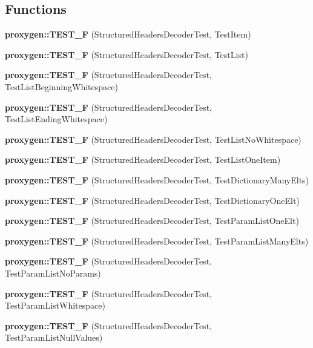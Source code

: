 \subsection*{Functions}
\begin{DoxyCompactItemize}
\item 
{\bf proxygen\+::\+T\+E\+S\+T\+\_\+F} (Structured\+Headers\+Decoder\+Test, Test\+Item)
\item 
{\bf proxygen\+::\+T\+E\+S\+T\+\_\+F} (Structured\+Headers\+Decoder\+Test, Test\+List)
\item 
{\bf proxygen\+::\+T\+E\+S\+T\+\_\+F} (Structured\+Headers\+Decoder\+Test, Test\+List\+Beginning\+Whitespace)
\item 
{\bf proxygen\+::\+T\+E\+S\+T\+\_\+F} (Structured\+Headers\+Decoder\+Test, Test\+List\+Ending\+Whitespace)
\item 
{\bf proxygen\+::\+T\+E\+S\+T\+\_\+F} (Structured\+Headers\+Decoder\+Test, Test\+List\+No\+Whitespace)
\item 
{\bf proxygen\+::\+T\+E\+S\+T\+\_\+F} (Structured\+Headers\+Decoder\+Test, Test\+List\+One\+Item)
\item 
{\bf proxygen\+::\+T\+E\+S\+T\+\_\+F} (Structured\+Headers\+Decoder\+Test, Test\+Dictionary\+Many\+Elts)
\item 
{\bf proxygen\+::\+T\+E\+S\+T\+\_\+F} (Structured\+Headers\+Decoder\+Test, Test\+Dictionary\+One\+Elt)
\item 
{\bf proxygen\+::\+T\+E\+S\+T\+\_\+F} (Structured\+Headers\+Decoder\+Test, Test\+Param\+List\+One\+Elt)
\item 
{\bf proxygen\+::\+T\+E\+S\+T\+\_\+F} (Structured\+Headers\+Decoder\+Test, Test\+Param\+List\+Many\+Elts)
\item 
{\bf proxygen\+::\+T\+E\+S\+T\+\_\+F} (Structured\+Headers\+Decoder\+Test, Test\+Param\+List\+No\+Params)
\item 
{\bf proxygen\+::\+T\+E\+S\+T\+\_\+F} (Structured\+Headers\+Decoder\+Test, Test\+Param\+List\+Whitespace)
\item 
{\bf proxygen\+::\+T\+E\+S\+T\+\_\+F} (Structured\+Headers\+Decoder\+Test, Test\+Param\+List\+Null\+Values)
\end{DoxyCompactItemize}
